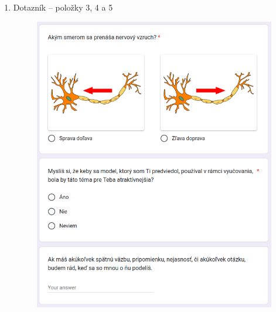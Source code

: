 \begin{enumerate}[leftmargin=*]
    \item Dotazník {--} položky 3, 4 a 5 \label{att:dot2}
    \begin{figure}[!htbp]
        \centering
        \includegraphics[width=14cm]{img/dot2.png}
    \end{figure}
    \newpage

\end{enumerate}
